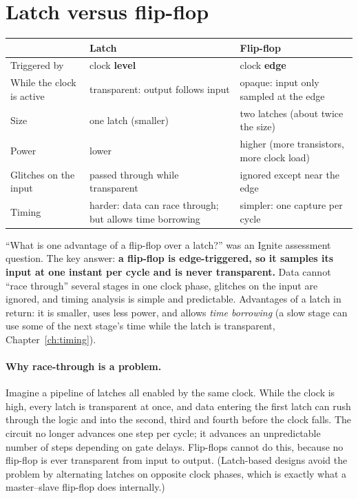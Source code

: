 \section{Latch versus flip-flop}
\label{sec:latchvsff}

\begin{center}
\begin{tabularx}{\linewidth}{>{\raggedright\arraybackslash}p{3.2cm}>{\raggedright\arraybackslash}X>{\raggedright\arraybackslash}X}
\toprule
 & Latch & Flip-flop \\
\midrule
Triggered by & clock \textbf{level} & clock \textbf{edge} \\
While the clock is active & transparent: output follows input & opaque: input only sampled at the edge \\
Size & one latch (smaller) & two latches (about twice the size) \\
Power & lower & higher (more transistors, more clock load) \\
Glitches on the input & passed through while transparent & ignored except near the edge \\
Timing & harder: data can race through; but allows time borrowing & simpler: one capture per cycle \\
\bottomrule
\end{tabularx}
\end{center}

\begin{onoa}
``What is one advantage of a flip-flop over a latch?'' was an Ignite assessment question. The key answer: \textbf{a flip-flop is edge-triggered, so it samples its input at one instant per cycle and is never transparent.} Data cannot ``race through'' several stages in one clock phase, glitches on the input are ignored, and timing analysis is simple and predictable. Advantages of a latch in return: it is smaller, uses less power, and allows \emph{time borrowing} (a slow stage can use some of the next stage's time while the latch is transparent, Chapter~\ref{ch:timing}).
\end{onoa}

\paragraph{Why race-through is a problem.} Imagine a pipeline of latches all enabled by the same clock. While the clock is high, every latch is transparent at once, and data entering the first latch can rush through the logic and into the second, third and fourth before the clock falls. The circuit no longer advances one step per cycle; it advances an unpredictable number of steps depending on gate delays. Flip-flops cannot do this, because no flip-flop is ever transparent from input to output. (Latch-based designs avoid the problem by alternating latches on opposite clock phases, which is exactly what a master--slave flip-flop does internally.)


